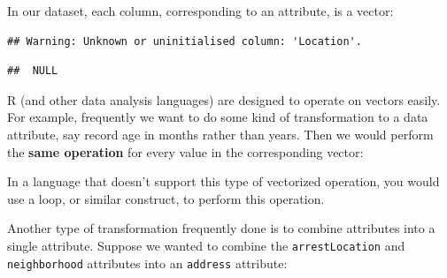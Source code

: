 \documentclass[12pt,]{book}
\newenvironment{Shaded}{\begin{snugshade}}{\end{snugshade}}
\newcommand{\KeywordTok}[1]{\textcolor[rgb]{0.13,0.29,0.53}{\textbf{#1}}}
\newcommand{\DataTypeTok}[1]{\textcolor[rgb]{0.13,0.29,0.53}{#1}}
\newcommand{\DecValTok}[1]{\textcolor[rgb]{0.00,0.00,0.81}{#1}}
\newcommand{\StringTok}[1]{\textcolor[rgb]{0.31,0.60,0.02}{#1}}
\newcommand{\CommentTok}[1]{\textcolor[rgb]{0.56,0.35,0.01}{\textit{#1}}}
\newcommand{\OperatorTok}[1]{\textcolor[rgb]{0.81,0.36,0.00}{\textbf{#1}}}
\newcommand{\NormalTok}[1]{#1}
\theoremstyle{definition}
\theoremstyle{definition}
\theoremstyle{definition}
\theoremstyle{remark}
\begin{document}
In our dataset, each column, corresponding to an attribute, is a vector:

\begin{Shaded}
\end{Shaded}

\begin{verbatim}
## Warning: Unknown or uninitialised column: 'Location'.
\end{verbatim}

\begin{verbatim}
##  NULL
\end{verbatim}

R (and other data analysis languages) are designed to operate on vectors
easily. For example, frequently we want to do some kind of
transformation to a data attribute, say record age in months rather than
years. Then we would perform the \textbf{same operation} for every value
in the corresponding vector:

\begin{Shaded}
\end{Shaded}

In a language that doesn't support this type of vectorized operation,
you would use a loop, or similar construct, to perform this operation.

Another type of transformation frequently done is to combine attributes
into a single attribute. Suppose we wanted to combine the
\texttt{arrestLocation} and \texttt{neighborhood} attributes into an
\texttt{address} attribute:

\begin{Shaded}
\end{Shaded}
\end{document}
